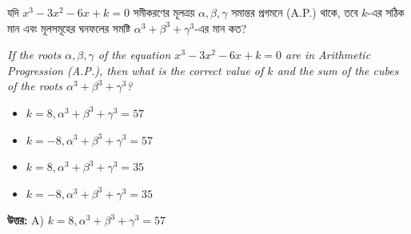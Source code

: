 \documentclass[12pt, a4paper]{article}
\begin{document}
\vspace{1em}

\begin{tcolorbox}[questionbox={প্রশ্ন (Question) 44}]
    \noindent
    যদি $x^3 - 3x^2 - 6x + k = 0$ সমীকরণের মূলত্রয় $\alpha, \beta, \gamma$ সমান্তর প্রগমনে (A.P.) থাকে, তবে $k$-এর সঠিক মান এবং মূলসমূহের ঘনফলের সমষ্টি $\alpha^3 + \beta^3 + \gamma^3$-এর মান কত?
    
    \vspace{0.8em}
    \begin{english}
    \noindent\textit{\color{darkgray}
    If the roots $\alpha, \beta, \gamma$ of the equation $x^3 - 3x^2 - 6x + k = 0$ are in Arithmetic Progression (A.P.), then what is the correct value of $k$ and the sum of the cubes of the roots $\alpha^3 + \beta^3 + \gamma^3$?
    }
    \end{english}
\end{tcolorbox}

\begin{itemize}[label={}, leftmargin=1cm, itemsep=0.5em]
    \item[\textbf{A)}] $k = 8, \alpha^3 + \beta^3 + \gamma^3 = 57$
    \item[\textbf{B)}] $k = -8, \alpha^3 + \beta^3 + \gamma^3 = 57$
    \item[\textbf{C)}] $k = 8, \alpha^3 + \beta^3 + \gamma^3 = 35$
    \item[\textbf{D)}] $k = -8, \alpha^3 + \beta^3 + \gamma^3 = 35$
\end{itemize}

\vspace{0.5em}
\begin{tcolorbox}[answerbox]
    \textbf{\color{success} উত্তর:} A) $k = 8, \alpha^3 + \beta^3 + \gamma^3 = 57$
\end{tcolorbox}
\vspace{1em}
\end{document}
